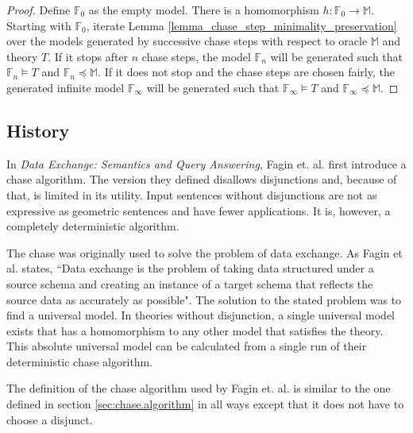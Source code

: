 		\begin{proof}
			Define $\mathbb{F}_0$ as the empty model. There is a homomorphism
			$h : \mathbb{F}_0 \to \mathbb{M}$.  Starting with $\mathbb{F}_0$,
			iterate Lemma \ref{lemma_chase_step_minimality_preservation} over
			the models generated by successive chase steps with respect to
			oracle $\mathbb{M}$ and theory $T$. If it stops after $n$ chase
			steps, the model $\mathbb{F}_n$ will be generated such that
			$\mathbb{F}_n \models T$ and $\mathbb{F}_n \preceq \mathbb{M}$. If
			it does not stop and the chase steps are chosen fairly, the
			generated infinite model $\mathbb{F}_\infty$ will be generated such
			that $\mathbb{F}_\infty \models T$ and $\mathbb{F}_\infty \preceq
			\mathbb{M}$.
		\end{proof}

	\subsection{History}

		In \cite{FKMP02} \emph{Data Exchange: Semantics and Query Answering},
		Fagin et. al. first introduce a chase algorithm. The version they
		defined disallows disjunctions and, because of that, is limited in its
		utility. Input sentences without disjunctions are not as expressive
		as geometric sentences and have fewer applications. It is, however, a
		completely deterministic algorithm.

		The chase was originally used to solve the problem of data exchange. As
		Fagin et al. states, ``Data exchange is the problem of taking data
		structured under a source schema and creating an instance of a target
		schema that reflects the source data as accurately as possible". The
		solution to the stated problem was to find a universal model. In theories
		without disjunction, a single universal model exists that has a
		homomorphism to any other model that satisfies the theory. This
		absolute universal model can be calculated from a single run of their
		deterministic chase algorithm.

		The definition of the chase algorithm used by Fagin et. al. is similar
		to the one defined in section \ref{sec:chase.algorithm} in all ways
		except that it does not have to choose a disjunct.


